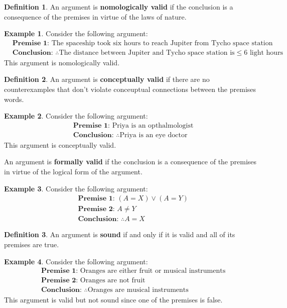 \documentclass{tufte-handout}
\theoremstyle{definition}
\newtheorem{defn}{Definition}
\theoremstyle{example}
\newtheorem{exmp}{Example}
\theoremstyle{remark}
\begin{document}
\begin{defn}
  An argument is \textbf{nomologically valid} if the conclusion is a consequence of the premises in virtue of the laws of nature.
\end{defn}
\begin{exmp}
  Consider the following argument:
  \begin{align*}
     & \textbf{Premise 1: } \text{The spaceship took six hours to reach Jupiter from Tycho space station}                        \\
     & \textbf{Conclusion: } \therefore \text{The distance between Jupiter and Tycho space station is} \leq \text{6 light hours}
  \end{align*}
  This argument is nomologically valid.
\end{exmp}
\begin{defn}
  An argument is \textbf{conceptually valid} if there are no counterexamples that don't violate conceuptual connections between the premises words.
\end{defn}
\begin{exmp}
  Consider the following argument:
  \begin{align*}
     & \textbf{Premise 1: } \text{Priya is an opthalmologist}         \\
     & \textbf{Conclusion: } \therefore \text{Priya is an eye doctor}
  \end{align*}
  This argument is conceptually valid.
\end{exmp}
\begin{framed}
  An argument is \textbf{formally valid} if the conclusion is a consequence of the premises in virtue of the logical form of the argument.
\end{framed}
\begin{exmp}
  Consider the following argument:
  \begin{align*}
     & \textbf{Premise 1: } (A = X) \lor (A = Y) \\
     & \textbf{Premise 2: } A \neq Y             \\
     & \textbf{Conclusion: } \therefore A = X
  \end{align*}
\end{exmp}
\begin{defn}
  An argument is \textbf{sound} if and only if it is valid and all of its premises are true.
\end{defn}
\begin{exmp}
  Consider the following argument:
  \begin{align*}
     & \textbf{Premise 1: } \text{Oranges are either fruit or musical instruments} \\
     & \textbf{Premise 2: } \text{Oranges are not fruit}                           \\
     & \textbf{Conclusion: } \therefore \text{Oranges are musical instruments}
  \end{align*}
  This argument is valid but not sound since one of the premises is false.
\end{exmp}
\end{document}
